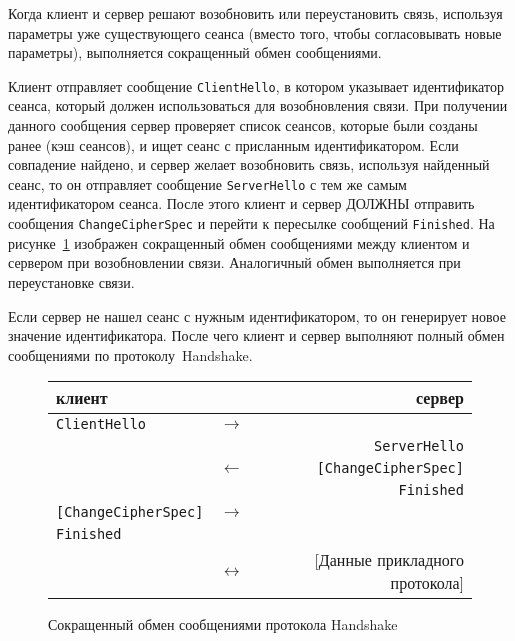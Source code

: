 Когда клиент и сервер решают возобновить или переустановить связь, 
используя параметры уже существующего сеанса (вместо того, чтобы 
согласовывать новые параметры), выполняется сокращенный обмен 
сообщениями.  

Клиент отправляет сообщение \lstinline{ClientHello}, в котором указывает
идентификатор сеанса, который должен использоваться для возобновления связи. 
При получении данного сообщения сервер проверяет список сеансов, которые 
были созданы ранее (кэш сеансов), и ищет сеанс с присланным 
идентификатором. Если совпадение найдено, и сервер желает возобновить 
связь, используя найденный сеанс, то он отправляет сообщение 
\lstinline{ServerHello} с тем же самым идентификатором сеанса. После этого 
клиент и сервер ДОЛЖНЫ отправить сообщения \lstinline{ChangeCipherSpec} и 
перейти к пересылке сообщений \lstinline{Finished}. На 
рисунке~\ref{Fig.Handshake.2} изображен сокращенный обмен сообщениями 
между клиентом и сервером при возобновлении связи. Аналогичный обмен 
выполняется при переустановке связи.

Если сервер не нашел сеанс с нужным идентификатором, то он генерирует 
новое значение идентификатора. После чего клиент и сервер выполняют полный 
обмен сообщениями по протоколу~Handshake.

\begin{figure}[!h]
\begin{center}
\begin{tabular}{lcr}
\hline
клиент  & \hspace{3cm} & сервер \\
\hline
\lstinline|ClientHello|	& $\to$     &\\
\hline                              
	                    &           &\lstinline|ServerHello|\\
                        &  $\gets$  &\lstinline|[ChangeCipherSpec]|\\
                        &           &\lstinline|Finished|\\
\hline
\lstinline|[ChangeCipherSpec]| & $\to$ &\\
\lstinline|Finished|           &       &\\
\hline
[Данные прикладного протокола]	& $\leftrightarrow$ &	
[Данные прикладного протокола] \\
\hline
\end{tabular}
\end{center}
\caption{Сокращенный обмен сообщениями протокола Handshake}\label{Fig.Handshake.2}
\end{figure}

